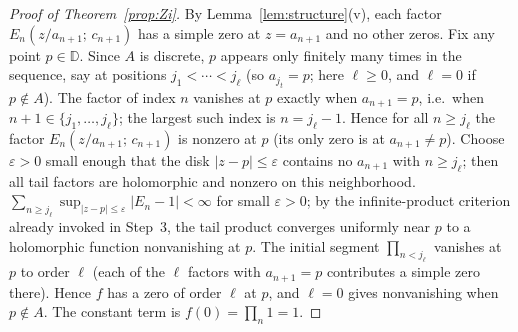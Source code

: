\documentclass{amsart}
\theoremstyle{definition}
\newcommand{\D}{\mathbb{D}}
\newcommand{\abs}[1]{\left|#1\right|}
\begin{document}
\begin{proof}[Proof of Theorem~\ref{prop:Zi}]
By Lemma~\ref{lem:structure}(v), each factor $E_n(z/a_{n+1};\,c_{n+1})$
has a simple zero at $z = a_{n+1}$ and no other zeros.  Fix any point
$p \in \D$.  Since $A$ is discrete, $p$ appears only finitely many
times in the sequence, say at positions $j_1 < \cdots < j_\ell$ (so
$a_{j_t} = p$; here $\ell \geq 0$, and $\ell = 0$ if $p \notin A$).
The factor of index $n$ vanishes at $p$ exactly when $a_{n+1} = p$,
i.e.\ when $n + 1 \in \{j_1,\ldots,j_\ell\}$; the largest such index is
$n = j_\ell - 1$.  Hence for all $n \geq j_\ell$ the factor
$E_n(z/a_{n+1};\,c_{n+1})$ is nonzero at $p$ (its only zero is at
$a_{n+1} \neq p$).  Choose
$\varepsilon > 0$ small enough that the disk $\abs{z - p} \leq
\varepsilon$ contains no $a_{n+1}$ with $n \geq j_\ell$; then all tail
factors are holomorphic and nonzero on this neighborhood.
$\sum_{n \geq j_\ell} \sup_{|z-p| \leq \varepsilon} |E_n - 1| < \infty$
for small $\varepsilon > 0$; by the infinite-product criterion already
invoked in Step~3, the tail product converges uniformly near $p$ to a
holomorphic function nonvanishing at $p$.  The initial segment
$\prod_{n < j_\ell}$ vanishes at $p$ to order $\ell$ (each of the
$\ell$ factors with $a_{n+1} = p$ contributes a simple zero there).
Hence $f$ has a zero of order $\ell$ at $p$, and $\ell = 0$ gives
nonvanishing when $p \notin A$.  The constant term is
$f(0) = \prod_n 1 = 1$.\end{proof}
\end{document}

